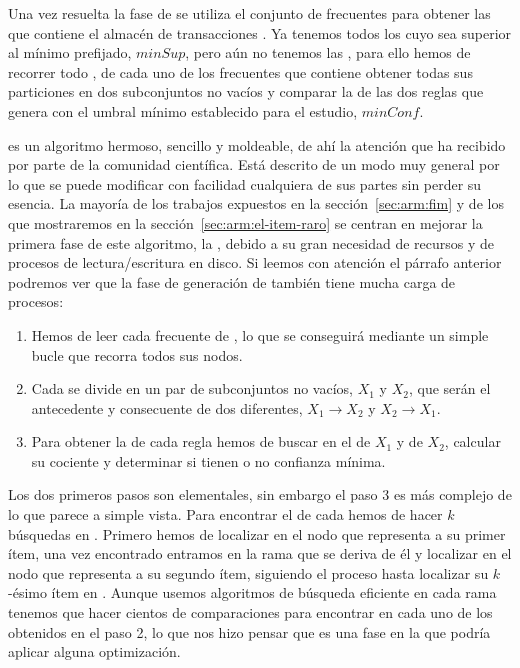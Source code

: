 Una vez resuelta la fase de \fim se utiliza el conjunto \aprioriL de \itemsets frecuentes para obtener las \ARs que contiene el almacén de transacciones \D. Ya tenemos todos los \itemsets cuyo \soporte sea superior al mínimo prefijado, $minSup$, pero aún no tenemos las \ARs, para ello hemos de recorrer todo \aprioriL, de cada uno de los \itemsets frecuentes que contiene obtener todas sus particiones en dos subconjuntos no vacíos y comparar la \confianza de las dos reglas que genera con el umbral mínimo establecido para el estudio, $minConf$.

\apriori es un algoritmo hermoso, sencillo y moldeable, de ahí la atención que ha recibido por parte de la comunidad científica. Está descrito de un modo muy general por lo que se puede modificar con facilidad cualquiera de sus partes sin perder su esencia. La mayoría de los trabajos expuestos en la sección~\ref{sec:arm:fim} y de los que mostraremos en la sección~\ref{sec:arm:el-item-raro} se centran en mejorar la primera fase de este algoritmo, la \fim, debido a su gran necesidad de recursos y de procesos de lectura/escritura en disco. Si leemos con atención el párrafo anterior podremos ver que la fase de generación de \ars también tiene mucha carga de procesos:

\begin{enumerate}
  \item Hemos de leer cada \itemset frecuente de \aprioriL, lo que se conseguirá mediante un simple bucle que recorra todos sus nodos.
  \item Cada \itemset se divide en un par de subconjuntos no vacíos, $X_1$ y $X_2$, que serán el antecedente y consecuente de dos \ARs diferentes, $X_1 \rightarrow X_2$ y $X_2 \rightarrow X_1$.
  \item Para obtener la \confianza de cada regla hemos de buscar en \aprioriL el \soporte de $X_1$ y de $X_2$, calcular su cociente y determinar si tienen o no confianza mínima.
\end{enumerate}

Los dos primeros pasos son elementales, sin embargo el paso 3 es más complejo de lo que parece a simple vista. Para encontrar el \soporte de cada \kitemset hemos de hacer $k$ búsquedas en \aprioriL. Primero hemos de localizar en \aprioriL[1] el nodo que representa a su primer ítem, una vez encontrado entramos en la rama que se deriva de él y localizar en \aprioriL[2] el nodo que representa a su segundo ítem, siguiendo el proceso hasta localizar su $k$-ésimo ítem en \aprioriL[k]. Aunque usemos algoritmos de búsqueda eficiente en cada rama tenemos que hacer cientos de comparaciones para encontrar en \aprioriL cada uno de los \itemsets obtenidos en el paso 2, lo que nos hizo pensar que es una fase en la que podría aplicar alguna optimización.
